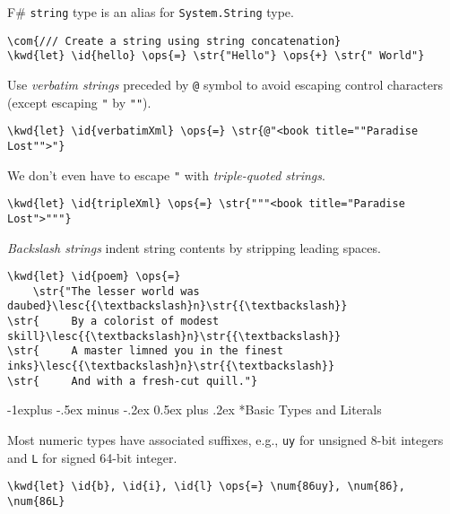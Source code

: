 \documentclass[10pt,landscape]{article}
\makeatletter
\renewcommand{\subsection}{\@startsection{subsection}{2}{0mm}%
                                {-1explus -.5ex minus -.2ex}%
                                {0.5ex plus .2ex}%
                                {\normalfont\normalsize\bfseries}}
\newcommand{\id}[1]{\textcolor[HTML]{000000}{#1}}
\newcommand{\str}[1]{\textcolor[HTML]{A31515}{#1}}
\newcommand{\kwd}[1]{\textcolor[HTML]{0000FF}{#1}}
\newcommand{\com}[1]{\textcolor[HTML]{008000}{#1}}
\newcommand{\ops}[1]{\textcolor[HTML]{000000}{#1}}
\newcommand{\num}[1]{\textcolor[HTML]{000000}{#1}}
\newcommand{\lesc}[1]{\textcolor[HTML]{FF0080}{#1}}
\makeatother
\begin{document}
\begin{multicols}{3}
F\# \texttt{string} type is an alias for \texttt{System.String} type.
\begin{Verbatim}[commandchars=\\\{\}]
\com{/// Create a string using string concatenation}
\kwd{let} \id{hello} \ops{=} \str{"Hello"} \ops{+} \str{" World"}

\end{Verbatim}



Use \emph{verbatim strings} preceded by \texttt{@} symbol to avoid escaping control characters (except escaping \texttt{"} by \texttt{""}).
\begin{Verbatim}[commandchars=\\\{\}]
\kwd{let} \id{verbatimXml} \ops{=} \str{@"<book title=""Paradise Lost"">"}

\end{Verbatim}



We don't even have to escape \texttt{"} with \emph{triple-quoted strings}.
\begin{Verbatim}[commandchars=\\\{\}]
\kwd{let} \id{tripleXml} \ops{=} \str{"""<book title="Paradise Lost">"""}

\end{Verbatim}



\emph{Backslash strings} indent string contents by stripping leading spaces.
\begin{Verbatim}[commandchars=\\\{\}]
\kwd{let} \id{poem} \ops{=} 
    \str{"The lesser world was daubed}\lesc{{\textbackslash}n}\str{{\textbackslash}}
\str{     By a colorist of modest skill}\lesc{{\textbackslash}n}\str{{\textbackslash}}
\str{     A master limned you in the finest inks}\lesc{{\textbackslash}n}\str{{\textbackslash}}
\str{     And with a fresh-cut quill."}

\end{Verbatim}

\subsection*{Basic Types and Literals}



Most numeric types have associated suffixes, e.g., \texttt{uy} for unsigned 8-bit integers and \texttt{L} for signed 64-bit integer.
\begin{Verbatim}[commandchars=\\\{\}]
\kwd{let} \id{b}, \id{i}, \id{l} \ops{=} \num{86uy}, \num{86}, \num{86L}


\end{Verbatim}
\end{multicols}
\end{document}
